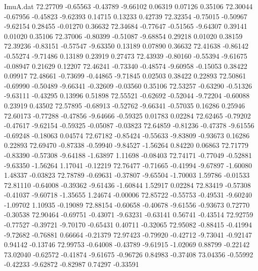 \begin{filecontents}{ImuA.dat}
  72.27709   -0.65563   -0.43789   -9.66102    0.06319    0.07126    0.35106
  72.30044   -0.67956   -0.45823   -9.62393    0.14715    0.13233    0.42739
  72.32354   -0.75015   -0.50967   -9.62154    0.28455   -0.01270    0.36632
  72.34684   -0.77647   -0.51565   -9.64307    0.39141    0.01020    0.35106
  72.37006   -0.80399   -0.51087   -9.68854    0.29218    0.01020    0.38159
  72.39236   -0.83151   -0.57547   -9.63350    0.13189    0.07890    0.36632
  72.41638   -0.86142   -0.55274   -9.71486    0.13189    0.23919    0.27473
  72.43939   -0.80160   -0.55394   -9.61675   -0.08947    0.21629    0.12207
  72.46241   -0.73340   -0.48574   -9.60958   -0.15053    0.38422    0.09917
  72.48661   -0.73699   -0.44865   -9.71845    0.02503    0.38422    0.22893
  72.50861   -0.69990   -0.50489   -9.66341   -0.32609   -0.03560    0.35106
  72.53257   -0.63290   -0.51326   -9.63111   -0.43295    0.13996    0.51898
  72.55521   -0.62692   -0.52044   -9.72204   -0.60088    0.23919    0.43502
  72.57895   -0.68913   -0.52762   -9.66341   -0.57035    0.16286    0.25946
  72.60173   -0.77288   -0.47856   -9.64666   -0.59325    0.01783    0.02284
  72.62465   -0.79202   -0.47617   -9.62154   -0.59325   -0.05087   -0.03823
  72.64859   -0.81236   -0.47378   -9.61556   -0.69248   -0.18063    0.04574
  72.67182   -0.85424   -0.55633   -9.83809   -0.93673    0.16286    0.22893
  72.69470   -0.87338   -0.59940   -9.84527   -1.56264    0.84220    0.06863
  72.71779   -0.83390   -0.57308   -9.64188   -1.63897    1.11698   -0.08403
  72.74171   -0.77049   -0.52881   -9.63350   -1.56264    1.17041   -0.12219
  72.76477   -0.71665   -0.41994   -9.67897   -1.60080    1.48337   -0.03823
  72.78789   -0.69631   -0.37807   -9.65504   -1.70003    1.59786   -0.01533
  72.81110   -0.64008   -0.39362   -9.61436   -1.60844    1.52917    0.02284
  72.83419   -0.57308   -0.41037   -9.60718   -1.35655    1.24674   -0.00006
  72.85722   -0.55753   -0.49531   -9.60240   -1.09702    1.10935   -0.19089
  72.88154   -0.60658   -0.40678   -9.61556   -0.93673    0.72770   -0.30538
  72.90464   -0.69751   -0.43071   -9.63231   -0.63141    0.56741   -0.43514
  72.92759   -0.77527   -0.39721   -9.70170   -0.65431    0.40711   -0.32065
  72.95082   -0.88415   -0.41994   -9.72682   -0.76881    0.66664   -0.21379
  72.97423   -0.79920   -0.42712   -9.73041   -0.92147    0.94142   -0.13746
  72.99753   -0.64008   -0.43789   -9.61915   -1.02069    0.88799   -0.22142
  73.02040   -0.62572   -0.41874   -9.61675   -0.96726    0.84983   -0.37408
  73.04356   -0.55992   -0.42233   -9.62872   -0.82987    0.74297   -0.33591

\end{filecontents}
